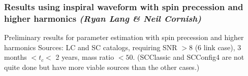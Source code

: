 \documentclass{iopart}
\begin{document}



\subsubsection{Results using inspiral waveform with spin precession and higher harmonics  {\it (Ryan Lang \& Neil Cornish)}}
\label{SSS:MBHbPEInspPrecHHRyan}


Preliminary results for parameter estimation with spin precession and higher harmonics
Sources: LC and SC catalogs, requiring SNR $> 8$ (6 link case), 3 months $< t_c < $ 2 years, mass ratio $< 50$.  (SCClassic and SCConfig4 are not quite done but have more viable sources than the other cases.)
\end{document}
